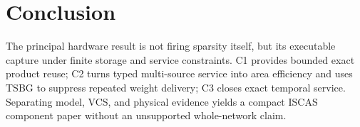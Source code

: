 \documentclass[conference]{IEEEtran}
\begin{document}
\section{Conclusion}
The principal hardware result is not firing sparsity itself, but its executable
capture under finite storage and service constraints.  C1 provides bounded
exact product reuse; C2 turns typed multi-source service into area efficiency
and uses TSBG to suppress repeated weight delivery; C3 closes exact temporal
service.  Separating model, VCS, and physical evidence yields a compact ISCAS
component paper without an unsupported whole-network claim.



\end{document}
